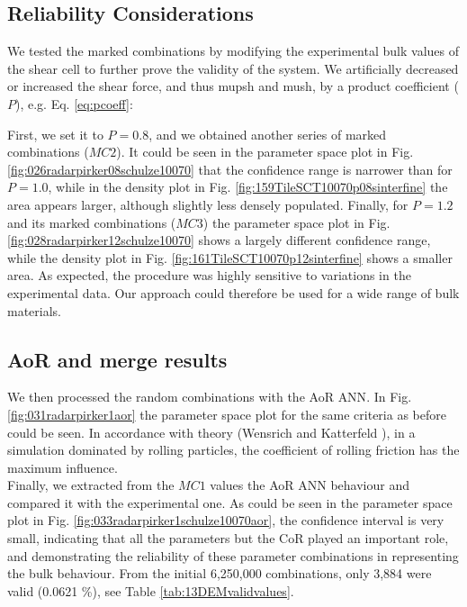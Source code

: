 

\subsection{Reliability Considerations}
\label{subsec:reliabilityconsiderations}

We tested the marked combinations
by modifying the experimental bulk values of the shear cell to further prove
the validity of the system.
We artificially decreased or increased the shear force, and thus \acs{mupsh} and
\acs{mush}, by a product coefficient ($P$), e.g. Eq. \ref{eq:pcoeff}:

First, we set it to $P=0.8$, and we obtained another
series of marked combinations ($MC2$).
It could be seen in the parameter space plot in Fig.
\ref{fig:026radarpirker08schulze10070} that the confidence range is narrower
than for $P=1.0$, while in the density plot in Fig. 
\ref{fig:159TileSCT10070p08sinterfine} the area
appears larger, although slightly less densely populated. Finally, for $P=1.2$
and its marked combinations ($MC3$) the parameter space plot in Fig.
\ref{fig:028radarpirker12schulze10070} shows a largely different confidence
range, while the density plot in Fig. \ref{fig:161TileSCT10070p12sinterfine} 
shows a smaller area. As expected, the procedure was highly sensitive to
variations in the experimental data.
Our approach could therefore be used
for a wide range of bulk materials.\\

\subsection{AoR and merge results}
\label{subsec:aorandmergeresults}

We then processed the random combinations with the \acs{AoR} \acs{ANN}. In Fig.
\ref{fig:031radarpirker1aor} the parameter space plot for the same criteria as
before could be seen.
In accordance with theory (Wensrich and Katterfeld \cite{RefWorks:87}), in a simulation dominated
by rolling particles, the coefficient of rolling friction has the maximum
influence. \\
Finally, we extracted from the $MC1$ values the \acs{AoR} \acs{ANN} behaviour
and compared it with the experimental one.
As could be seen in the parameter space plot in Fig.
\ref{fig:033radarpirker1schulze10070aor}, the confidence interval is very small,
indicating that all the parameters but the \acs{CoR} played an important role, 
and demonstrating the reliability of these parameter
combinations in representing the bulk behaviour.
From the initial 6,250,000 combinations, only 3,884 were valid (0.0621
\%), see Table \ref{tab:13DEMvalidvalues}.
% 

